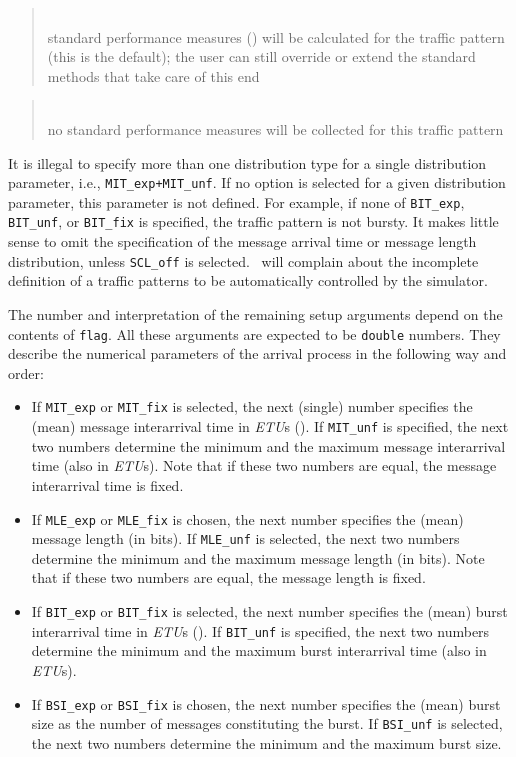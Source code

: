 \begin{quote}
\noindent{}\\ \hspace{0in}
standard performance measures
()
will be calculated for the traffic pattern (this is the default);
the user can still override or extend the standard methods that take care of
this end
\end{quote}

\begin{quote}
\noindent{}\\ \hspace{0in}
no standard performance measures will be collected for this traffic pattern
\end{quote}\medskip

It is illegal to specify more than one distribution type for a single
distribution parameter, i.e., {\tt MIT\_exp+MIT\_unf}.
If no option is selected for a given distribution parameter, this parameter
is not defined.
For example, if none of {\tt BIT\_exp}, {\tt BIT\_unf}, or
{\tt BIT\_fix} is specified, the traffic pattern is not bursty.
It makes little sense to omit the specification of the message arrival time
or message length distribution, unless {\tt SCL\_off} is selected.
\smurph\ will complain about the incomplete definition of a traffic patterns
to be automatically controlled by the simulator.

The number and interpretation of the remaining setup arguments depend
on the contents of {\tt flag}.
All these arguments are expected to be {\tt double} numbers.
They describe the numerical parameters of the arrival process in the following
way and order:
\begin{itemize}
\item
If {\tt MIT\_exp} or {\tt MIT\_fix}
is selected, the next (single) number specifies the (mean)
message interarrival time in {\em ETU\/}s ().
If {\tt MIT\_unf} is specified, the next two numbers determine the
minimum and the maximum message interarrival time (also in {\em ETU\/}s).
Note that if these two numbers are equal, the message interarrival time is
fixed.
\item
If {\tt MLE\_exp} or {\tt MLE\_fix}
is chosen, the next number specifies the (mean)
message length (in bits).
If {\tt MLE\_unf} is selected, the next two numbers determine the
minimum and the maximum message length (in bits).
Note that if these two numbers are equal, the message length is
fixed.
\item
If {\tt BIT\_exp} or {\tt BIT\_fix}
is selected, the next number specifies the (mean)
burst interarrival time in {\em ETU\/}s ().
If {\tt BIT\_unf} is specified, the next two numbers determine the
minimum and the maximum burst interarrival time (also in {\em ETU\/}s).
\item
If {\tt BSI\_exp} or {\tt BSI\_fix}
is chosen, the next number specifies the (mean)
burst size as the number of messages constituting the burst.
If {\tt BSI\_unf} is selected, the next two numbers determine the
minimum and the maximum burst size.
\end{itemize}

